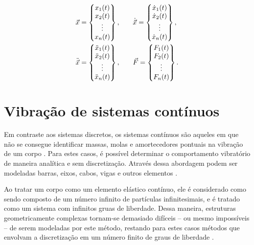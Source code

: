 \documentclass[12pt,oneside,english,brazil,lmodern,siglas,simbolos,cite=num]{ucsmonograph}
\begin{document}
	\begin{align} \label{eqn:vetores}
		\vec{x} =
		\begin{Bmatrix}
			x_1(t)\\ x_2(t)\\ \vdots\\ x_n(t)\\
		\end{Bmatrix},\qquad &
		\dot{\vec{x}} = 
		\begin{Bmatrix}
			\dot{x}_1(t)\\ \dot{x}_2(t)\\ \vdots\\ \dot{x}_n(t)\\
		\end{Bmatrix}, \notag\\
		\ddot{\vec{x}} = 
		\begin{Bmatrix}
			\ddot{x}_1(t)\\ \ddot{x}_2(t)\\ \vdots \\ \ddot{x}_n(t)\\  
		\end{Bmatrix},\qquad &
		\vec{F} = 
		\begin{Bmatrix}
			F_1(t)\\ F_2(t)\\ \vdots\\ F_n(t)\\
		\end{Bmatrix}.
	\end{align}
	
	\section{Vibração de sistemas contínuos}
	Em contraste aos sistemas discretos, os sistemas contínuos são aqueles em que não se consegue identificar massas, molas e amortecedores pontuais na vibração de um corpo \cite{rao:2008}.
	Para estes casos, é possível determinar o comportamento vibratório de maneira analítica e sem discretização.
	Através dessa abordagem podem ser modeladas barras, eixos, cabos, vigas e outros elementos \cite{timoshenko:1974}.
	
	Ao tratar um corpo como um elemento elástico contínuo, ele é considerado como sendo composto de um número infinito de partículas infinitesimais, e é tratado como um sistema com infinitos gruas de liberdade.
	Dessa maneira, estruturas geometricamente complexas tornam-se demasiado difíceis -- ou mesmo impossíveis -- de serem modeladas por este método, restando para estes casos métodos que envolvam a discretização em um número finito de graus de liberdade \cite{timoshenko:1974}.
	
\end{document}
